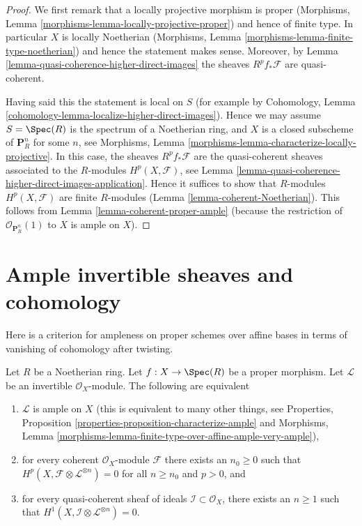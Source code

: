 \begin{proof}
We first remark that a locally projective morphism is proper
(Morphisms, Lemma \ref{morphisms-lemma-locally-projective-proper})
and hence of finite type.
In particular $X$ is locally Noetherian
(Morphisms, Lemma \ref{morphisms-lemma-finite-type-noetherian})
and hence the statement makes sense.
Moreover, by Lemma \ref{lemma-quasi-coherence-higher-direct-images}
the sheaves $R^pf_*\mathcal{F}$ are quasi-coherent.

\medskip\noindent
Having said this the statement is local on $S$ (for example by
Cohomology, Lemma \ref{cohomology-lemma-localize-higher-direct-images}).
Hence we may assume $S = \Spec(R)$ is the spectrum of
a Noetherian ring, and $X$ is a closed subscheme of
$\mathbf{P}^n_R$ for some $n$, see
Morphisms, Lemma \ref{morphisms-lemma-characterize-locally-projective}.
In this case, the sheaves $R^pf_*\mathcal{F}$ are the quasi-coherent
sheaves associated to the $R$-modules $H^p(X, \mathcal{F})$, see
Lemma \ref{lemma-quasi-coherence-higher-direct-images-application}.
Hence it suffices to show that $R$-modules $H^p(X, \mathcal{F})$
are finite $R$-modules (Lemma \ref{lemma-coherent-Noetherian}).
This follows from Lemma \ref{lemma-coherent-proper-ample}
(because the restriction of $\mathcal{O}_{\mathbf{P}^n_R}(1)$
to $X$ is ample on $X$).
\end{proof}








\section{Ample invertible sheaves and cohomology}
\label{section-ample-cohomology}

\noindent
Here is a criterion for ampleness on proper schemes over affine bases
in terms of vanishing of cohomology after twisting.

\begin{lemma}
\label{lemma-vanshing-gives-ample}
\begin{reference}
\cite[III Proposition 2.6.1]{EGA}
\end{reference}
Let $R$ be a Noetherian ring. Let $f : X \to \Spec(R)$ be a proper morphism.
Let $\mathcal{L}$ be an invertible $\mathcal{O}_X$-module.
The following are equivalent
\begin{enumerate}
\item $\mathcal{L}$ is ample on $X$ (this is equivalent to many other
things, see
Properties, Proposition \ref{properties-proposition-characterize-ample} and
Morphisms, Lemma
\ref{morphisms-lemma-finite-type-over-affine-ample-very-ample}),
\item for every coherent $\mathcal{O}_X$-module $\mathcal{F}$ there exists
an $n_0 \geq 0$ such that
$H^p(X, \mathcal{F} \otimes \mathcal{L}^{\otimes n}) = 0$ for all $n \geq n_0$
and $p > 0$, and
\item for every quasi-coherent sheaf of ideals
$\mathcal{I} \subset \mathcal{O}_X$, there exists an $n \geq 1$
such that $H^1(X, \mathcal{I} \otimes \mathcal{L}^{\otimes n}) = 0$.
\end{enumerate}
\end{lemma}

